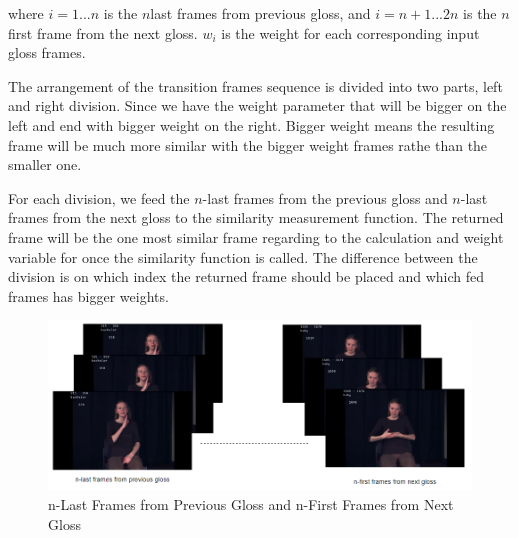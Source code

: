 \documentclass{sig-alternate-05-2015}
\begin{document}
where \begin{math}i=1...n\end{math} is the \begin{math}n\end{math}last frames from previous gloss, and \begin{math}i=n+1...2n\end{math} is the \begin{math}n\end{math} first frame from the next gloss. \begin{math}w_i\end{math} is the weight for each corresponding input gloss frames.

The arrangement of the transition frames sequence is divided into two parts, left and right division. Since we have the weight parameter that will be bigger on the left and end with bigger weight on the right. Bigger weight means the resulting frame will be much more similar with the bigger weight frames rathe than the smaller one.

For each division, we feed the \begin{math}n\end{math}-last frames from the previous gloss and \begin{math}n\end{math}-last frames from the next gloss to the similarity measurement function. The returned frame will be the one most similar frame regarding to the calculation and weight variable for once the similarity function is called. The difference between the division is on which index the returned frame should be placed and which fed frames has bigger weights. 

\begin{figure}
	\centering
	\includegraphics[width=\linewidth]{img/ncorrframes.png}
	\caption{n-Last Frames from Previous Gloss and n-First Frames from Next Gloss}
\end{figure}
\end{document}
